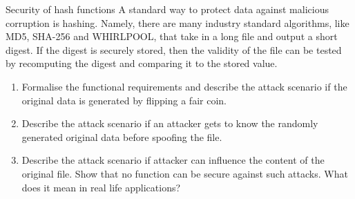 \documentclass{crypto-exercise}
\begin{document}
\begin{exercise}{Security of hash functions}
  A standard way to protect data against malicious corruption is
  hashing. Namely, there are many industry standard algorithms, like
  MD5, SHA-256 and WHIRLPOOL, that take in a long file and output a
  short digest. If the digest is securely stored, then the validity of
  the file can be tested by recomputing the digest and comparing it to
  the stored value.
  \begin{enumerate}
  \item Formalise the functional requirements and describe the attack
    scenario if the original data is generated by flipping a fair
    coin.
  \item Describe the attack scenario if an attacker gets to know the
    randomly generated original data before spoofing the file.
  \item Describe the attack scenario if attacker can influence the
    content of the original file. Show that no function can be secure
    against such attacks. What does it mean in real life applications?
  \end{enumerate}
\end{exercise}
\end{document}
